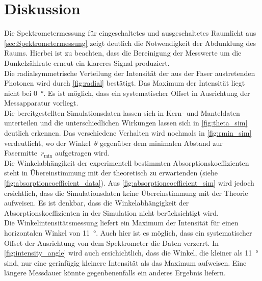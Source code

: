 \section{Diskussion}
\label{sec:Diskussion}
Die Spektrometermessung für eingeschaltetes und ausgeschaltetes Raumlicht aus \autoref{sec:Spektrometermessung} zeigt deutlich die Notwendigkeit der Abdunklung des
Raums. Hierbei ist zu beachten, dass die Bereinigung der Messwerte um die Dunkelzählrate erneut ein klareres Signal produziert. \\
Die radialsymmetrische Verteilung der Intensität der aus der Faser austretenden Photonen wird durch \autoref{fig:radial} bestätigt. Das Maximum der Intensität liegt nicht 
bei \qty{0}{\degree}. Es ist möglich, dass ein systematischer Offset in Ausrichtung der Messapparatur vorliegt. \\
Die bereitgestellten Simulationsdaten lassen sich in Kern- und Manteldaten unterteilen und die unterschiedlichen Wirkungen lassen sich in \autoref{fig:theta_sim}
deutlich erkennen.
Das verschiedene Verhalten wird nochmals in \autoref{fig:rmin_sim} verdeutlicht, wo der Winkel~$\theta$ gegenüber dem minimalen Abstand zur Fasermitte~$r_{\text{min}}$
aufgetragen wird. \\
Die Winkelabhängikeit der experimentell bestimmten Absorptionskoeffizienten steht in Übereinstimmung mit der theoretisch zu erwartenden (siehe \autoref{fig:absorptioncoefficient_data}).
Aus \autoref{fig:absorptioncoefficient_sim} wird jedoch ersichtlich, dass die Simulationsdaten keine Übereinstimmung mit der Theorie aufweisen. Es ist denkbar, dass
die Winkelabhängigkeit der Absorptionskoeffizienten in der Simulation nicht berücksichtigt wird. \\
Die Winkelintensitätsmessung liefert ein Maximum der Intensität für einen horizontalen Winkel von \qty{11}{\degree}. Auch hier ist es möglich, dass ein systematischer Offset
der Ausrichtung von dem Spektrometer die Daten verzerrt. In \autoref{fig:intensity_angle} wird auch ersichichtlich, dass die Winkel, die kleiner als \qty{11}{\degree} sind,
nur eine gerinfügig kleinere Intensität als das Maximum aufweisen. Eine längere Messdauer könnte gegenbenenfalls ein anderes Ergebnis liefern.
 